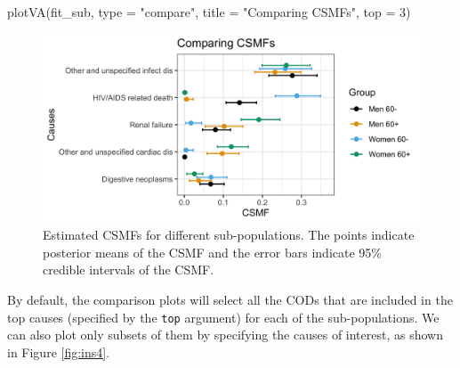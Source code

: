 \begin{Schunk}
\begin{Sinput}
plotVA(fit_sub, type = "compare", title = "Comparing CSMFs", top = 3)
\end{Sinput}
\begin{figure}[!h]

{\centering \includegraphics[width=0.9\linewidth,]{openVA-RJ-R1_files/figure-latex/ins3-1} 

}

\caption[Estimated CSMFs for different sub-populations]{Estimated CSMFs for different sub-populations. The points indicate posterior means of the CSMF and the error bars indicate 95\% credible intervals of the CSMF.}\label{fig:ins3}
\end{figure}
\end{Schunk}

By default, the comparison plots will select all the CODs that are
included in the top causes (specified by the \texttt{top} argument) for
each of the sub-populations. We can also plot only subsets of them by
specifying the causes of interest, as shown in Figure \ref{fig:ins4}.

